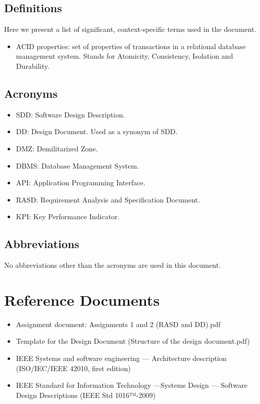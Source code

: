 \subsection{Definitions}
Here we present a list of significant, context-specific terms used in the document. 
\begin{itemize}
	\item ACID properties: set of properties of transactions in a relational database management system. Stands for Atomicity, Consistency, Isolation and Durability.
\end{itemize}
\subsection{Acronyms}
\begin{itemize}
	\item SDD: Software Design Description.
	\item DD: Design Document. Used as a synonym of SDD.
	\item DMZ: Demilitarized Zone.
	\item DBMS: Database Management System.
	\item API: Application Programming Interface.
	\item RASD: Requirement Analysis and Specification Document.
	\item KPI: Key Performance Indicator.
\end{itemize}
\subsection{Abbreviations}
No abbreviations other than the acronyms are used in this document.

\section{Reference Documents}
\begin{itemize}
	\item Assignment document: Assignments 1 and 2 (RASD and DD).pdf
	\item Template for the Design Document (Structure of the design document.pdf)
 	\item IEEE Systems and software engineering — Architecture description (ISO/IEC/IEEE 42010, first edition)
 	\item IEEE Standard for Information Technology —Systems Design — Software Design Descriptions (IEEE Std 1016™-2009)
\end{itemize} 
 
